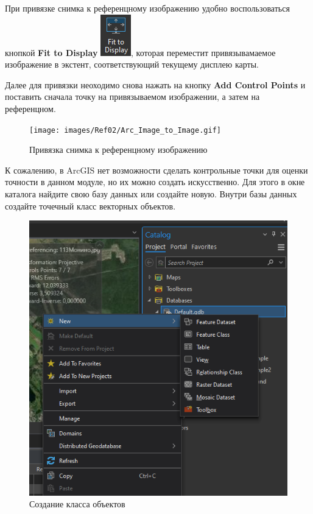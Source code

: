 \documentclass[
  12pt,
]{book}
\begin{document}
При привязке снимка к референцному изображению удобно воспользоваться кнопкой \textbf{Fit to Display} \includegraphics{images/Ref02/Arc_Fit_to_Display.png}, которая переместит привязывамаемое изображение в экстент, соответствующий текущему дисплею карты.

Далее для привязки неоходимо снова нажать на кнопку \textbf{Add Control Points} и поставить сначала точку на привязываемом изображении, а затем на референцном.

\begin{figure}
\centering
\texttt{[image: images/Ref02/Arc\_Image\_to\_Image.gif]}
\caption{Привязка снимка к референцному изображению}
\end{figure}

К сожалению, в ArcGIS нет возможности сделать контрольные точки для оценки точности в данном модуле, но их можно создать искусственно. Для этого в окне каталога найдите свою базу данных или создайте новую. Внутри базы данных создайте точечный класс векторных объектов.

\begin{figure}
\centering
\includegraphics{images/Ref02/Arc_Create_FC.png}
\caption{Создание класса объектов}
\end{figure}
\end{document}
